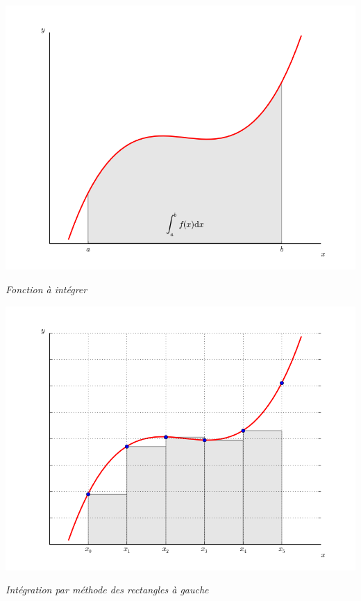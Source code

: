 \documentclass[10pt]{article}
\begin{document}


\noindent\begin{minipage}[c]{.24\linewidth}
\begin{center}
\includegraphics[width=\textwidth]{images/CourbesPython/fonc}

\textit{Fonction à intégrer}
\end{center}
\end{minipage} \hfill
\begin{minipage}[c]{.24\linewidth}
\begin{center}
\includegraphics[width=\textwidth]{images/CourbesPython/rect_g}

\textit{Intégration par méthode des rectangles à gauche}
\end{center}
\end{minipage} \hfill
\end{document}
